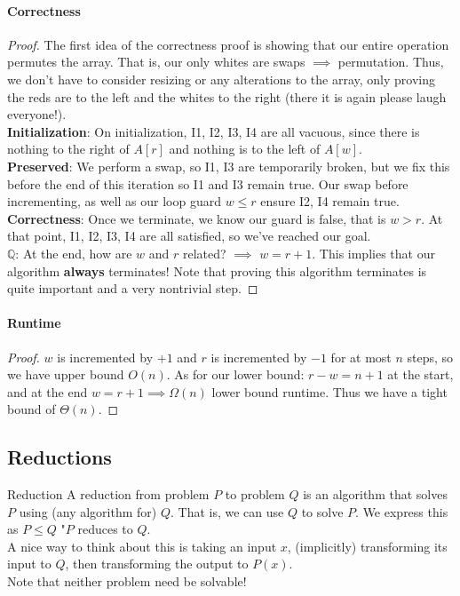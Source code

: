 \documentclass[11pt]{article}
\begin{document}
\paragraph{Correctness}
\begin{proof}
    The first idea of the correctness proof is showing that our entire operation permutes the array.
    That is, our only whites are swaps $\implies$ permutation. Thus, we don't have to consider
    resizing or any alterations to the array, only proving the reds are to the left and the whites
    to the right (there it is again please laugh everyone!). \\
    \textbf{Initialization}: On initialization, I1, I2, I3, I4 are all vacuous, since there is 
    nothing to the right of $A[r]$ and nothing is to the left of $A[w]$. \\
    \textbf{Preserved}: We perform a swap, so I1, I3 are temporarily broken, but we fix this before
    the end of this iteration so I1 and I3 remain true. Our swap before incrementing, as well as our
    loop guard $w \leq r$ ensure I2, I4 remain true. \\
    \textbf{Correctness}: Once we terminate, we know our guard is false, that is $w > r$.
    At that point, I1, I2, I3, I4 are all satisfied, so we've reached our goal. \\
    $\mathbb{Q}$: At the end, how are $w$ and $r$ related? $\implies$ $w=r+1$. This implies that our
    algorithm \textbf{always} terminates! Note that proving this algorithm terminates is quite
    important and a very nontrivial step.
\end{proof}

\paragraph{Runtime}
\begin{proof}
    $w$ is incremented by $+1$ and $r$ is incremented by $-1$ for at most $n$ steps, so we have upper
    bound $O(n)$. As for our lower bound: $r-w=n+1$ at the start, and at the end $w=r+1 \implies 
    \Omega(n)$ lower bound runtime. Thus we have a tight bound of $\Theta(n)$.
\end{proof}

\subsection{Reductions}

\begin{definitionbox}{Reduction}
    A reduction from problem $P$ to problem $Q$ is an algorithm that solves $P$ using (any algorithm
    for) $Q$. That is, we can use $Q$ to solve $P$. We express this as $P \leq Q$ "$P$ reduces to
    $Q$. \\
    A nice way to think about this is taking an input $x$, (implicitly) transforming its input to 
    $Q$, then transforming the output to $P(x)$. \\
    Note that neither problem need be solvable!
\end{definitionbox}
\end{document}
